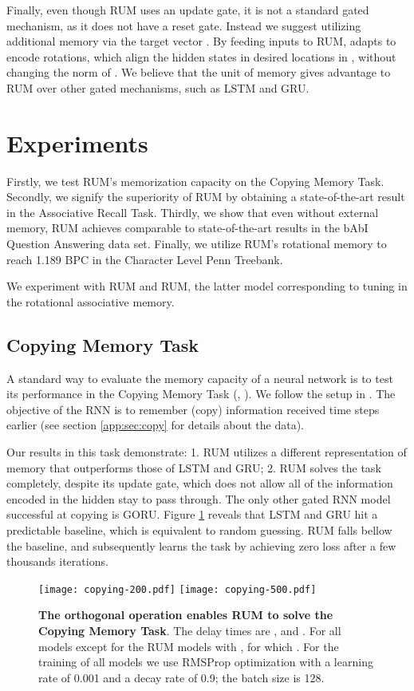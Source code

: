 \documentclass{article} \usepackage{iclr2018_conference,times}
\begin{document}
Finally, even though RUM uses an update gate, it is not a standard gated mechanism, as it does not have a reset gate. Instead we suggest utilizing additional memory via the target vector . By feeding inputs to RUM,  adapts to encode rotations, which align the hidden states in desired locations in , without changing the norm of . We believe that the unit of memory  gives advantage to RUM over other gated mechanisms, such as LSTM and GRU.

\section{Experiments} \label{main:sec:experiments}
Firstly, we test RUM's memorization capacity on the Copying Memory Task. Secondly, we signify the superiority of RUM by obtaining a state-of-the-art result in the Associative Recall Task. Thirdly, we show that even without external memory, RUM achieves comparable to state-of-the-art results in the bAbI Question Answering data set. Finally, we utilize RUM's rotational memory to reach 1.189 BPC in the Character Level Penn Treebank.

We experiment with  RUM and  RUM, the latter model corresponding to tuning in the rotational associative memory. 

\subsection{Copying Memory Task}
A standard way to evaluate the memory capacity of a neural network is to test its performance in the Copying Memory Task (\cite{hochreiter1997long}, \cite{henaff2016orthogonal}
\cite{arjovsky2015unitary}). We follow the setup in \cite{jing2016tunable}. The objective of the RNN is to remember (copy) information received  time steps earlier (see section \ref{app:sec:copy} for details about the data).

Our results in this task demonstrate: 1. RUM utilizes a different representation of memory that outperforms those of LSTM and GRU; 2. RUM solves the task completely, despite its update gate, which does not allow all of the information encoded in the hidden stay to pass through. The only other gated RNN model successful at copying is GORU. Figure \ref{main:fig:copying} reveals that LSTM and GRU hit a predictable baseline, which is equivalent to random guessing. RUM falls bellow the baseline, and subsequently learns the task by achieving zero loss after a few thousands iterations.

\begin{figure}[h!]
\centering
\texttt{[image: copying-200.pdf]}
\texttt{[image: copying-500.pdf]}
\caption{\textbf{The orthogonal operation  enables RUM to solve the Copying Memory Task}. The delay times are ,  and . For all models  except for the RUM models with , for which . For the training of all models we use RMSProp optimization with a learning rate of 0.001 and a decay rate of 0.9; the batch size  is 128.}
\label{main:fig:copying}
\end{figure}
\end{document}
